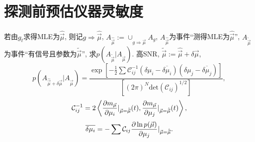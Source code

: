 \section{探测前预估仪器灵敏度}

若由$g_t$求得MLE为$\hat{\vec{\mu}}$, 则记$g\Rightarrow \hat{\vec{\mu}}$, $A_{\hat{\vec{\mu}}}:=\cup_{g\Rightarrow \hat{\vec{\mu}}}A_g$, $A_{\hat{\vec{\mu}}}$为事件``测得MLE为$\hat{\vec{\mu}}$'', $A_{\tilde{\vec{\mu}}}$为事件``有信号且参数为$\tilde{\vec{\mu}}$'', 求$p(A_{\tilde{\vec{\mu}}}|A_{\hat{\vec{\mu}}})$. 高SNR, $\tilde{\vec{\mu}}:=\hat{\vec{\mu}}+\delta\vec{\mu}$,
\begin{equation}
    p(A_{\hat{\vec{\mu}}+\delta\vec{\mu}}|A_{\hat{\vec{\mu}}})=\frac{\exp[-\frac{1}{2}\sum\mathcal{C}_{ij}^{-1}(\delta\mu_i-\overline{\delta\mu_i})(\delta\mu_j-\overline{\delta\mu_j})]}{[(2\pi)^N\text{det}(\mathcal{C}_{ij})^{1/2}]},
\end{equation}
\begin{equation}
    \mathcal{C}_{ij}^{-1}=2\left\langle \frac{\partial m_{\vec{\mu}}}{\partial \mu_i}|_{\vec{\mu}=\hat{\vec{\mu}}}(t),\frac{\partial m_{\vec{\mu}}}{\partial \mu_j}|_{\vec{\mu}=\hat{\vec{\mu}}}(t)\right\rangle,
\end{equation}
\begin{equation}
    \overline{\delta\mu_i}=-\sum\mathcal{C}_{ij}\frac{\partial\ln p(\vec{\mu})}{\partial \mu_j}|_{\vec{\mu}=\hat{\vec{\mu}}}.
\end{equation}
